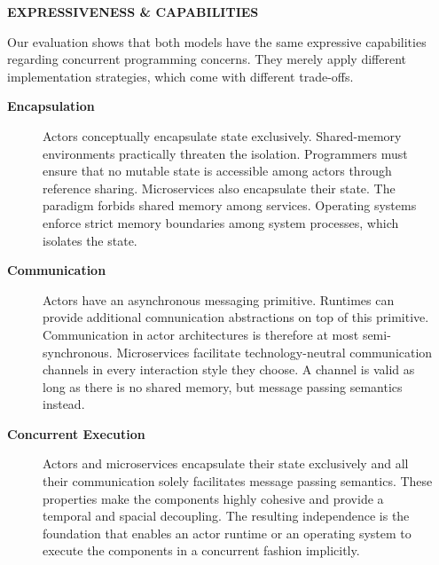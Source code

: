 \documentclass[final,hyperref={pdfpagelabels=true}]{beamer}
\begin{document}
\begin{frame}
  \begin{columns}[t]
    \begin{column}{.02\textwidth}
      \end{column}
    \begin{column}{.46\textwidth}
      \textsf{\textbf{EXPRESSIVENESS \& CAPABILITIES}} \\
      \vspace*{\baselineskip}
      {\lmodern

        Our evaluation shows that both models have the same expressive capabilities regarding concurrent programming concerns. They merely apply different implementation strategies, which come with different trade-offs.

        \vspace*{\baselineskip}

        \begin{description}
          \item[\textbf{\textsf{Encapsulation}}] Actors conceptually encapsulate state exclusively. Shared-memory environments practically threaten the isolation. Programmers must ensure that no mutable state is accessible among actors through reference sharing. Microservices also encapsulate their state. The paradigm forbids shared memory among services. Operating systems enforce strict memory boundaries among system processes, which isolates the state.

          \vspace*{\baselineskip}

          \item[\textbf{\textsf{Communication}}] Actors have an asynchronous messaging primitive. Runtimes can provide additional comnunication abstractions on top of this primitive. Communication in actor architectures is therefore at most semi-synchronous. Microservices facilitate technology-neutral communication channels in every interaction style they choose. A channel is valid as long as there is no shared memory, but message passing semantics instead.

          \vspace*{\baselineskip}

          \item[\textbf{\textsf{Concurrent Execution}}] Actors and microservices encapsulate their state exclusively and all their communication solely facilitates message passing semantics. These properties make the components highly cohesive and provide a temporal and spacial decoupling. The resulting independence is the foundation that enables an actor runtime or an operating system to execute the components in a concurrent fashion implicitly.


\end{description}}
\end{column}
\end{columns}
\end{frame}
\end{document}
